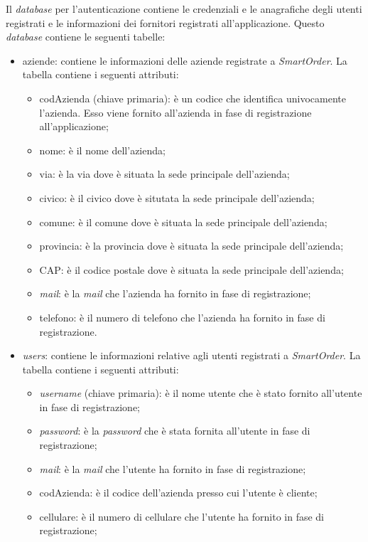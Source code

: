 \documentclass[12pt, a4paper, titlepage]{report}
\begin{document}
	Il \textit{database} per l'autenticazione contiene le credenziali e le anagrafiche degli utenti registrati e le informazioni dei fornitori registrati all'applicazione. Questo \textit{database} contiene le seguenti tabelle:
	\begin{itemize}
		\item aziende: contiene le informazioni delle aziende registrate a \textit{SmartOrder}. La tabella contiene i seguenti attributi:
		\begin{itemize}
			\item codAzienda (chiave primaria): è un codice che identifica univocamente l'azienda. Esso viene fornito all'azienda in fase di registrazione all'applicazione;
			\item nome: è il nome dell'azienda;
			\item via: è la via dove è situata la sede principale dell'azienda;
			\item civico: è il civico dove è situtata la sede principale dell'azienda;
			\item comune: è il comune dove è situata la sede principale dell'azienda;
			\item provincia: è la provincia dove è situata la sede principale dell'azienda;
			\item CAP: è il codice postale dove è situata la sede principale dell'azienda;
			\item \textit{mail}: è la \textit{mail} che l'azienda ha fornito in fase di registrazione;
			\item telefono: è il numero di telefono che l'azienda ha fornito in fase di registrazione.
		\end{itemize}
		\item \textit{users}: contiene le informazioni relative agli utenti registrati a \textit{SmartOrder}. La tabella contiene i seguenti attributi:
		\begin{itemize}
			\item \textit{username} (chiave primaria): è il nome utente che è stato fornito all'utente in fase di registrazione;
			\item \textit{password}: è la \textit{password} che è stata fornita all'utente in fase di registrazione;
			\item \textit{mail}: è la \textit{mail} che l'utente ha fornito in fase di registrazione;
			\item codAzienda: è il codice dell'azienda presso cui l'utente è cliente;
			\item cellulare: è il numero di cellulare che l'utente ha fornito in fase di registrazione;

\end{itemize}
\end{itemize}
\end{document}
